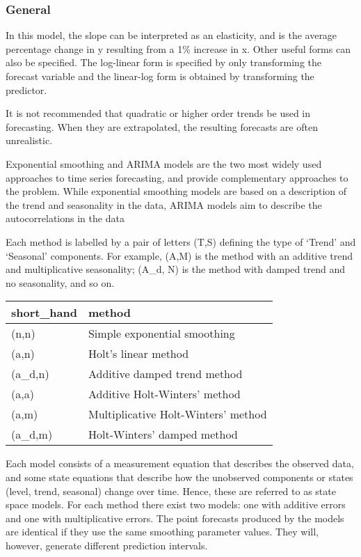 \documentclass[]{book}
\begin{document}
\hypertarget{general-5}{%
\subsubsection{General}\label{general-5}}

In this model, the slope can be interpreted as an elasticity, and is the average percentage change in y resulting from a 1\% increase in x. Other useful forms can also be specified. The log-linear form is specified by only transforming the forecast variable and the linear-log form is obtained by transforming the predictor.

It is not recommended that quadratic or higher order trends be used in forecasting. When they are extrapolated, the resulting forecasts are often unrealistic.

Exponential smoothing and ARIMA models are the two most widely used approaches to time series forecasting, and provide complementary approaches to the problem. While exponential smoothing models are based on a description of the trend and seasonality in the data, ARIMA models aim to describe the autocorrelations in the data

Each method is labelled by a pair of letters (T,S) defining the type of `Trend' and `Seasonal' components. For example, (A,M) is the method with an additive trend and multiplicative seasonality; (A\_d, N) is the method with damped trend and no seasonality, and so on.

\begin{longtable}[]{@{}ll@{}}
\toprule
short\_hand & method\tabularnewline
\midrule
\endhead
(n,n) & Simple exponential smoothing\tabularnewline
(a,n) & Holt's linear method\tabularnewline
(a\_d,n) & Additive damped trend method\tabularnewline
(a,a) & Additive Holt-Winters' method\tabularnewline
(a,m) & Multiplicative Holt-Winters' method\tabularnewline
(a\_d,m) & Holt-Winters' damped method\tabularnewline
\bottomrule
\end{longtable}

Each model consists of a measurement equation that describes the observed data, and some state equations that describe how the unobserved components or states (level, trend, seasonal) change over time. Hence, these are referred to as state space models. For each method there exist two models: one with additive errors and one with multiplicative errors. The point forecasts produced by the models are identical if they use the same smoothing parameter values. They will, however, generate different prediction intervals.
\end{document}
